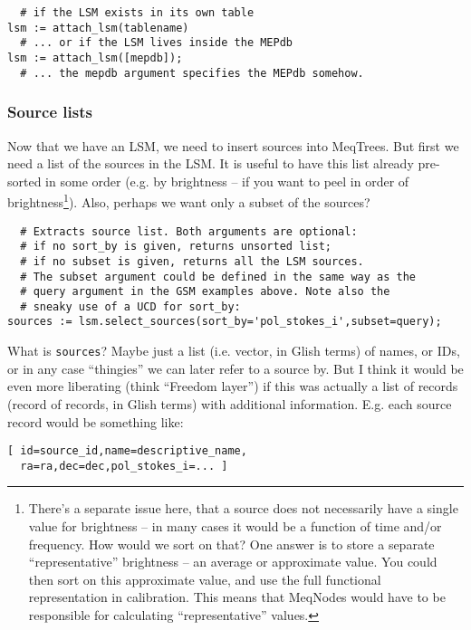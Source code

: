\documentclass[10pt]{article}
\begin{document}
\begin{verbatim}
  # if the LSM exists in its own table
lsm := attach_lsm(tablename)
  # ... or if the LSM lives inside the MEPdb
lsm := attach_lsm([mepdb]);
  # ... the mepdb argument specifies the MEPdb somehow.
\end{verbatim}

\subsubsection{Source lists}

Now that we have an LSM, we need to insert sources into MeqTrees. But first we
need a list of the sources in the LSM. It is useful to have this list already
pre-sorted in some order (e.g. by brightness -- if you want to peel in order of
brightness\footnote{There's a separate issue here, that a source does not 
necessarily have a single value for brightness -- in many cases it would
be a function of time and/or frequency. How would we sort on that? One answer is
to store a separate ``representative'' brightness -- an average or 
approximate value. You could then sort on this approximate value, and use
the full functional representation in calibration. This means that MeqNodes
would have to be responsible for calculating ``representative'' values.}). 
Also, perhaps we want only a subset of the sources?

\begin{verbatim} 
  # Extracts source list. Both arguments are optional: 
  # if no sort_by is given, returns unsorted list; 
  # if no subset is given, returns all the LSM sources.
  # The subset argument could be defined in the same way as the 
  # query argument in the GSM examples above. Note also the 
  # sneaky use of a UCD for sort_by:
sources := lsm.select_sources(sort_by='pol_stokes_i',subset=query); 
\end{verbatim}

What is {\tt sources}? Maybe just a list (i.e. vector, in Glish terms) of
names, or IDs, or in any case ``thingies'' we can later refer to a source by.
But I think it would be even more liberating (think ``Freedom layer'') if this
was actually a list of records (record of records, in Glish terms) with
additional information. E.g. each source record would be something like:

\begin{verbatim}
[ id=source_id,name=descriptive_name,
  ra=ra,dec=dec,pol_stokes_i=... ]
\end{verbatim}
\end{document}
